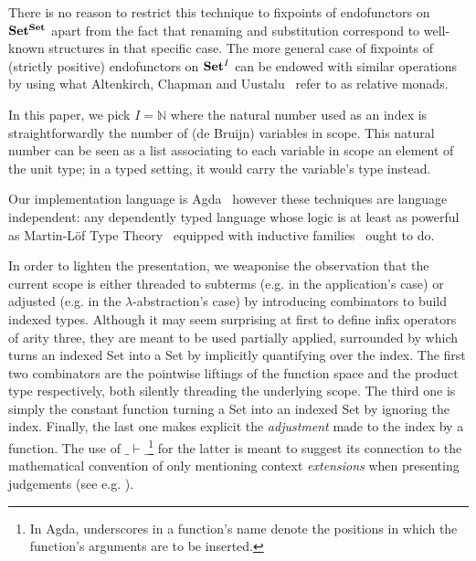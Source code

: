 There is no reason to restrict this technique to fixpoints of endofunctors
on $\mathbf{Set}{}^{\mathbf{Set}{}}$ apart from the fact that renaming and substitution
correspond to well-known structures in that specific case. The more general
case of fixpoints of (strictly positive) endofunctors on $\mathbf{Set}{}^I$ can be
endowed with similar operations by using what Altenkirch, Chapman and
Uustalu~\citeyear{Altenkirch2010, JFR4389} refer to as relative monads.

In this paper, we pick $I = \mathbb{N}$ where the natural number used as
an index is straightforwardly the number of (de Bruijn) variables in scope.
This natural number can be seen as a list associating to each variable in
scope an element of the unit type; in a typed setting, it would carry the
variable's type instead.

Our implementation language is Agda~\cite{norell2009dependently} however
these techniques are language independent: any dependently typed language
whose logic is at least as powerful as Martin-L\"of Type
Theory~\cite{martin1982constructive} equipped with inductive
families~\cite{dybjer1994inductive} ought to do.

In order to lighten the presentation, we weaponise the observation that the
current scope is either threaded to subterms (e.g. in the application's case)
or adjusted (e.g. in the $\lambda$-abstraction's case) by introducing combinators
to build indexed types. Although it may seem surprising at first to define
infix operators of arity three, they are meant to be used partially applied,
surrounded by \AF{[\_]} which turns an indexed Set into a Set by implicitly
quantifying over the index. The first two combinators are the pointwise liftings
of the function space and the product type respectively, both silently threading
the underlying scope. The third one is simply the constant function turning a Set
into an indexed Set by ignoring the index. Finally, the last one makes explicit
the \emph{adjustment} made to the index by a function. The use of $\_\vdash{}\_$\footnote{
In Agda, underscores in a function's name denote the positions in which the
function's arguments are to be inserted.} for the latter is meant to suggest
its connection to the mathematical convention of only mentioning context
\emph{extensions} when presenting judgements (see e.g. \cite{martin1982constructive}).

